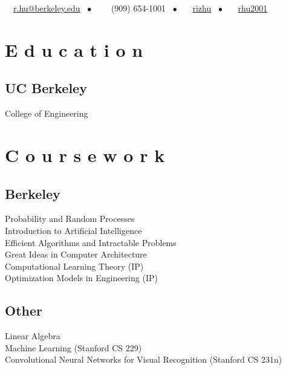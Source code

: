 \documentclass[]{deedy-resume-openfont}
\begin{document}
%
%
{\faEnvelope \ \ \href{mailto:r.hu@berkeley.edu}{r.hu@berkeley.edu} \ \(\bullet\) \ \ \faPhone \ \ (909)  654-1001 \ \(\bullet\) \ \faGithub \ \ \href{https://github.com/rizhu}{rizhu} \ \(\bullet\) \ \faLinkedin \ \ \href{https://www.linkedin.com/in/rhu2001/}{rhu2001}}

%
%

\begin{minipage}[t]{0.33\textwidth} 


\section{E d u c a t i o n} 

\subsection{UC Berkeley}
College of Engineering \\
\sectionsep


\section{C o u r s e w o r k}

\subsection{Berkeley}
Probability and Random Processes \\
Introduction to Artificial Intelligence \\
Efficient Algorithms and Intractable Problems \\
Great Ideas in Computer Architecture \\
Computational Learning Theory (IP) \\
Optimization Models in Engineering (IP)
\subsection{Other}
Linear Algebra \\
Machine Learning (Stanford CS 229) \\
Convolutional Neural Networks for Visual Recognition (Stanford CS 231n) \\
\sectionsep


\end{minipage}
\end{document}
